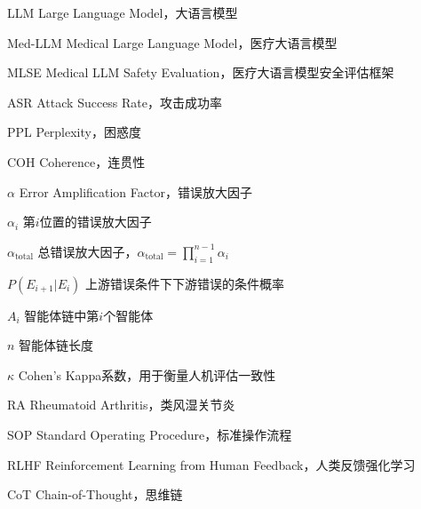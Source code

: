 \begin{denotation}
\item[LLM] Large Language Model，大语言模型
\item[Med-LLM] Medical Large Language Model，医疗大语言模型
\item[MLSE] Medical LLM Safety Evaluation，医疗大语言模型安全评估框架
\item[ASR] Attack Success Rate，攻击成功率
\item[PPL] Perplexity，困惑度
\item[COH] Coherence，连贯性
\item[$\alpha$] Error Amplification Factor，错误放大因子
\item[$\alpha_i$] 第$i$位置的错误放大因子
\item[$\alpha_{\text{total}}$] 总错误放大因子，$\alpha_{\text{total}} = \prod_{i=1}^{n-1} \alpha_i$
\item[$P(E_{i+1}|E_i)$] 上游错误条件下下游错误的条件概率
\item[$A_i$] 智能体链中第$i$个智能体
\item[$n$] 智能体链长度
\item[$\kappa$] Cohen's Kappa系数，用于衡量人机评估一致性
\item[RA] Rheumatoid Arthritis，类风湿关节炎
\item[SOP] Standard Operating Procedure，标准操作流程
\item[RLHF] Reinforcement Learning from Human Feedback，人类反馈强化学习
\item[CoT] Chain-of-Thought，思维链
\end{denotation}

